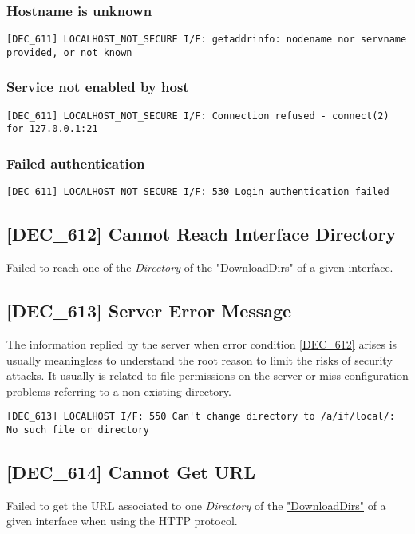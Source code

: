 \documentclass[dec_sum_main.tex]{subfiles}
\begin{document}
\subsubsection{Hostname is unknown}
\begin{verbatim}
[DEC_611] LOCALHOST_NOT_SECURE I/F: getaddrinfo: nodename nor servname provided, or not known
\end{verbatim}

\subsubsection{Service not enabled by host}
\begin{verbatim}
[DEC_611] LOCALHOST_NOT_SECURE I/F: Connection refused - connect(2) for 127.0.0.1:21
\end{verbatim}

\subsubsection{Failed authentication}
\begin{verbatim}
[DEC_611] LOCALHOST_NOT_SECURE I/F: 530 Login authentication failed
\end{verbatim}

\subsection{[DEC\_612] Cannot Reach Interface Directory}
\label{DEC612}
Failed to reach one of the \textit{Directory} of the \hyperref[DownloadDirs]{"DownloadDirs"} of a given interface.

\subsection{[DEC\_613] Server Error Message }
The information replied by the server when error condition \hyperref[DEC612]{[DEC\_612]} arises is usually meaningless to understand the root reason to limit the risks of security attacks. It usually is related to file permissions on the server or miss-configuration problems referring to a non existing directory.
\begin{verbatim}
[DEC_613] LOCALHOST I/F: 550 Can't change directory to /a/if/local/: No such file or directory
\end{verbatim}

\subsection{[DEC\_614] Cannot Get URL}
\label{DEC614}
Failed to get the URL associated to one \textit{Directory} of the \hyperref[DownloadDirs]{"DownloadDirs"} of a given interface when using the HTTP protocol.
\end{document}
